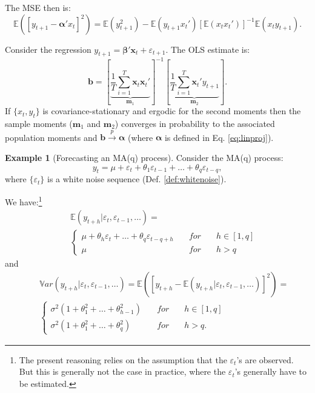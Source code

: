 \documentclass[
  12pt,
]{book}
\theoremstyle{definition}
\theoremstyle{definition}
\newtheorem{example}{Example}[chapter]
\theoremstyle{definition}
\theoremstyle{definition}
\theoremstyle{remark}
\begin{document}
The MSE then is:
\[
\mathbb{E}([y_{t+1} - \boldsymbol\alpha'x_t]^2) = \mathbb{E}{(y_{t+1}^2)} - \mathbb{E}\left( y_{t+1}x_t' \right)[\mathbb{E}\left(x_tx_t' \right)]^{-1}\mathbb{E}\left(x_ty_{t+1} \right).
\]

Consider the regression \(y_{t+1} = \boldsymbol\beta'\mathbf{x}_t + \varepsilon_{t+1}\). The OLS estimate is:
\[
\mathbf{b} = \left[ \underbrace{ \frac{1}{T} \sum_{i=1}^T \mathbf{x}_t\mathbf{x}_t'}_{\mathbf{m}_1} \right]^{-1}\left[  \underbrace{ \frac{1}{T} \sum_{i=1}^T \mathbf{x}_t'y_{t+1}}_{\mathbf{m}_2} \right].
\]
If \(\{x_t,y_t\}\) is covariance-stationary and ergodic for the second moments then the sample moments (\(\mathbf{m}_1\) and \(\mathbf{m}_2\)) converges in probability to the associated population moments and \(\mathbf{b} \overset{p}{\rightarrow} \boldsymbol\alpha\) (where \(\boldsymbol\alpha\) is defined in Eq. \eqref{eq:linproj}).

\begin{example}[Forecasting an MA(q) process]
\protect\hypertarget{exm:fcstMAq}{}\label{exm:fcstMAq}Consider the MA(q) process:
\[
y_t = \mu + \varepsilon_t + \theta_1 \varepsilon_{t-1} + \dots + \theta_q \varepsilon_{t-q},
\]
where \(\{\varepsilon_t\}\) is a white noise sequence (Def. \ref{def:whitenoise}).

We have:\footnote{The present reasoning relies on the assumption that the \(\varepsilon_t\)'s are observed. But this is generally not the case in practice, where the \(\varepsilon_t\)'s generally have to be estimated.}
\begin{eqnarray*}
&&\mathbb{E}(y_{t+h}|\varepsilon_{t},\varepsilon_{t-1},\dots) =\\
&&\left\{
\begin{array}{lll}
\mu + \theta_h \varepsilon_{t} + \dots + \theta_q \varepsilon_{t-q+h}  \quad &for& \quad h \in [1,q]\\
\mu \quad &for& \quad h > q
\end{array}
\right.
\end{eqnarray*}
and
\begin{eqnarray*}
&&\mathbb{V}ar(y_{t+h}|\varepsilon_{t},\varepsilon_{t-1},\dots)= \mathbb{E}\left( [y_{t+h} - \mathbb{E}(y_{t+h}|\varepsilon_{t},\varepsilon_{t-1},\dots)]^2 \right) =\\
&&\left\{
\begin{array}{lll}
\sigma^2(1+\theta_1^2+\dots+\theta_{h-1}^2) \quad &for& \quad h \in [1,q]\\
\sigma^2(1+\theta_1^2+\dots+\theta_q^2) \quad &for& \quad h>q.
\end{array}
\right.
\end{eqnarray*}
\end{example}
\end{document}
